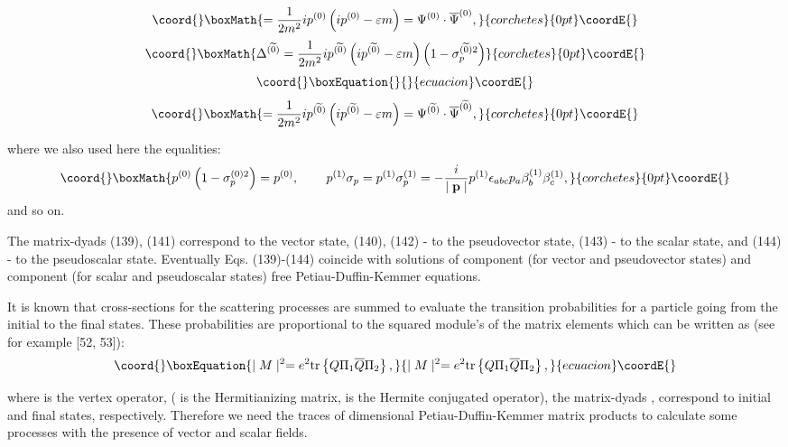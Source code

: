 \documentclass[a4paper,12pt]{article}
\begin{document}
\vspace{-8mm}
\[\coord{}\boxMath{
=\frac 1{2m^2}ip^{(0)}\left( ip^{(0)}-\varepsilon m\right) =\Psi
^{(0)}\cdot \overline{\Psi }^{(0)} ,
}{corchetes}{0pt}\coordE{}\]
\[\coord{}\boxMath{
\Delta ^{(\widetilde{0})}=\frac 1{2m^2}ip^{(\widetilde{0})}\left(
ip^{( \widetilde{0})}-\varepsilon m\right) \left( 1-\sigma
_p^{(\widetilde{0} )2}\right)
}{corchetes}{0pt}\coordE{}\]
\vspace{-8mm}
\begin{equation}\coord{}\boxEquation{  \label{144}
}{  }{ecuacion}\coordE{}\end{equation}
\vspace{-8mm}
\[\coord{}\boxMath{
=\frac 1{2m^2}ip^{(\widetilde{0})}\left(
ip^{(\widetilde{0})}-\varepsilon m\right) =\Psi
^{(\widetilde{0})}\cdot \overline{\Psi }^{(\widetilde{0})} ,
}{corchetes}{0pt}\coordE{}\]

where we also used here the equalities:
\[\coord{}\boxMath{
p^{(0)}\left( 1-\sigma _p^{(0)2}\right) =p^{(0)} ,
\hspace{0.3in}p^{(1)}\sigma _p=p^{(1)}\sigma _p^{(1)}=-\frac
i{\mid \mathbf{p}\mid }p^{(1)}\epsilon _{abc}p_a\beta
_b^{(1)}\beta _c^{(1)} ,
}{corchetes}{0pt}\coordE{}\]
and so on.

The matrix-dyads (139), (141) correspond to the vector state,
(140), (142) - to the pseudovector state, (143) - to the scalar
state, and (144) - to the pseudoscalar state. Eventually Eqs.
(139)-(144) coincide with solutions of \coordHE{}component (for vector
and pseudovector states) and \coordHE{}component (for scalar and
pseudoscalar states) free Petiau-Duffin-Kemmer equations.

It is known that cross-sections for the scattering processes are
summed to evaluate the transition probabilities for a particle
going from the initial to the final states. These probabilities
are proportional to the squared module's of the matrix elements
which can be written as (see for example [52, 53]):
\begin{equation}\coord{}\boxEquation{
\mid M\mid ^2=e^2\mbox{tr}\left\{ Q\Pi _1\overline{Q}\Pi
_2\right\} ,\label{145}
}{
\mid M\mid ^2=e^2\mbox{tr}\left\{ Q\Pi _1\overline{Q}\Pi
_2\right\} ,}{ecuacion}\coordE{}\end{equation}

where \coordHE{} is the vertex operator, \coordHE{}
(\coordHE{} is the Hermitianizing
matrix, \coordHE{} is the Hermite conjugated operator), the
matrix-dyads \coordHE{}, \coordHE{} correspond to initial and final
states, respectively. Therefore we need the traces of \coordHE{}dimensional Petiau-Duffin-Kemmer matrix products to calculate
some processes with the presence of vector and scalar fields.
\end{document}
